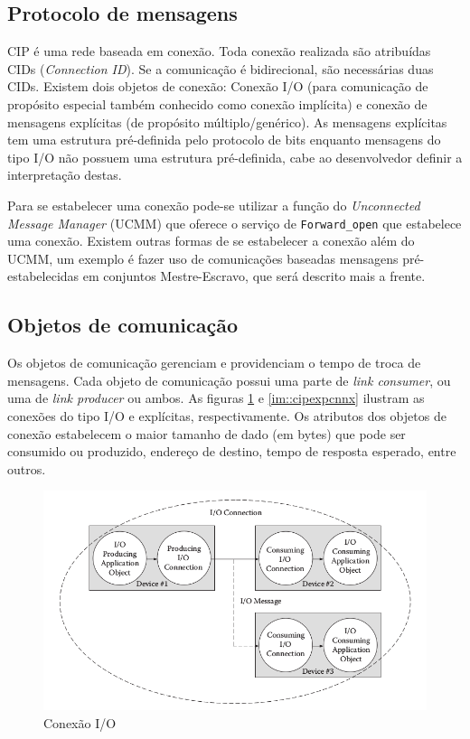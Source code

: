 \subsection{Protocolo de mensagens}

CIP é uma rede baseada em conexão. Toda conexão realizada são atribuídas CIDs ({\it Connection ID}). Se a comunicação é bidirecional, são necessárias duas CIDs. Existem dois objetos de conexão: Conexão I/O (para comunicação de propósito especial também conhecido como conexão implícita) e conexão de mensagens explícitas (de propósito múltiplo/genérico). As mensagens explícitas tem uma estrutura pré-definida pelo protocolo de bits enquanto mensagens do tipo I/O não possuem uma estrutura pré-definida, cabe ao desenvolvedor definir a interpretação destas.

Para se estabelecer uma conexão pode-se utilizar a função do {\it Unconnected Message Manager} (UCMM) que oferece o serviço de \texttt{Forward\_open} que estabelece uma conexão. Existem outras formas de se estabelecer a conexão além do UCMM, um exemplo é fazer uso de comunicações baseadas mensagens pré-estabelecidas em conjuntos Mestre-Escravo, que será descrito mais a frente.

\subsection{Objetos de comunicação}

Os objetos de comunicação gerenciam e providenciam o tempo de troca de mensagens. Cada objeto de comunicação possui uma parte de {\it link consumer}, ou uma de {\it link producer} ou ambos. As figuras \ref{im::cipiocnnx} e \ref{im::cipexpcnnx} ilustram as conexões do tipo I/O e explícitas, respectivamente. Os atributos dos objetos de conexão estabelecem o maior tamanho de dado (em bytes) que pode ser consumido ou produzido, endereço de destino, tempo de resposta esperado, entre outros. 

\begin{figure}[H]
\centering
\includegraphics[width=.9\textwidth]{imagens/CIPmessageIO}
\caption{ Conexão I/O \cite{cip1}}
\label{im::cipiocnnx}
\end{figure}

